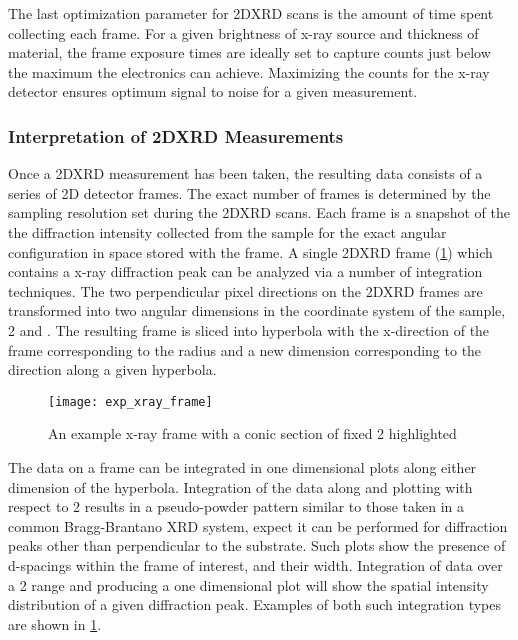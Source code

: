 The last optimization parameter for 2DXRD scans is the amount of time spent collecting each frame. For a given brightness of x-ray source and thickness of material, the frame exposure times are ideally set to capture counts just below the maximum the electronics can achieve. Maximizing the counts for the x-ray detector ensures optimum signal to noise for a given measurement.

\subsubsection{Interpretation of 2DXRD Measurements}
Once a 2DXRD measurement has been taken, the resulting data consists of a series of 2D detector frames. The exact number of frames is determined by the sampling resolution set during the 2DXRD scans. Each frame is a snapshot of the the diffraction intensity collected from the sample for the exact angular configuration in space stored with the frame. A single 2DXRD frame (\cref{fig:exp_xray_frame}) which contains a x-ray diffraction peak can be analyzed via a number of integration techniques. The two perpendicular pixel directions on the 2DXRD frames are transformed into two angular dimensions in the coordinate system of the sample, 2\straighttheta{} and \textchi \cite{He2009}. The resulting frame is sliced into hyperbola with the x-direction of the frame corresponding to the radius and a new dimension \textchi{} corresponding to the direction along a given hyperbola.
\begin{figure}
    \centering
    \texttt{[image: exp\_xray\_frame]}
    \caption[Example 2DXRD frame]{\label{fig:exp_xray_frame}An example x-ray frame with a conic section of fixed 2\straighttheta{} highlighted}
\end{figure}

The data on a frame can be integrated in one dimensional plots along either dimension of the hyperbola. Integration of the data along \textchi{} and plotting with respect to 2\straighttheta{} results in a pseudo-powder pattern similar to those taken in a common Bragg-Brantano XRD system, expect it can be performed for diffraction peaks other than perpendicular to the substrate. Such plots show the presence of d-spacings within the frame of interest, and their width. Integration of data over a 2\straighttheta{} range and producing a one dimensional plot will show the spatial intensity distribution of a given diffraction peak. Examples of both such integration types are shown in \cref{fig:exp_xray_frame}.

